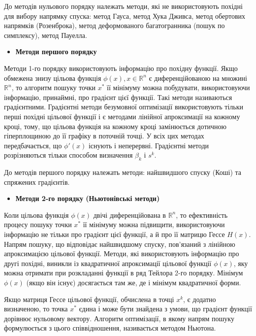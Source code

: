 	 До методів нульового порядку належать методи, які не використовують похідні для вибору напрямку спуска: метод Гауса, метод Хука Дживса, метод обертових напрямків (Розенброка), метод деформованого багатогранника (пошук по симплексу), метод Пауелла.
\begin{itemize}
	\item \textbf{Методи першого порядку}
\end{itemize}
	
	Методи 1-го порядку використовують інформацію про похідну функції. Якщо обмежена знизу цільова функція $\phi(x), x \in \mathbb{R}^n$ є диференційованою на множині $\mathbb{R}^n$, то алгоритм пошуку точки $x^*$ її мінімуму можна побудувати, використовуючи інформацію, принаймні, про градієнт цієї функції. Такі методи називаються градієнтними. Градієнтні методи безумовної оптимізації використовують тільки перші похідні цільової функції і є методами лінійної апроксимації на кожному кроці, тому, що цільова функція на кожному кроці замінюється дотичною гіперплощиною до її графіку в поточній точці.
	У всіх цих методах передбачається, що $\phi'(x)$ існують і неперервні. Градієнтні методи розрізняються тільки способом визначення $\beta_k$ і $s^k$. 
	
	До методів першого порядку належать методи: найшвидшого спуску (Коші) та спряжених градієнтів.
\begin{itemize}	
	\item \textbf{Методи 2-го порядку (Ньютонівські методи)}
\end{itemize}	

	Коли цільова функція $\phi(x)$ двічі диференційована в $\mathbb{R}^n$, то ефективність процесу пошуку точки $x^*$ її мінімуму можна підвищити, використовуючи інформацію не тільки  про градієнт цієї функції, а й про її матрицю Гессе $H(x)$. Напрям пошуку, що відповідає найшвидшому спуску, пов'язаний з лінійною апроксимацією цільової функції. Методи, які використовують інформацію про другі похідні, виникли із квадратичної апроксимації цільової функції $\phi(x)$, яку можна отримати при розкладанні функції в ряд Тейлора 2-го порядку. Мінімум $\phi(x)$ (якщо він існує)  досягається там же, де і мінімум квадратичної форми. 
	
	Якщо матриця Гессе цільової функції, обчислена в точці $x^k$, є додатно визначеною, то точка $x^*$ єдина і може бути знайдена з умови, що градієнт функції дорівнює нульовому вектору. Алгоритм оптимізації, в якому напрям пошуку формулюється з цього співвідношення, називається методом Ньютона. 
	
